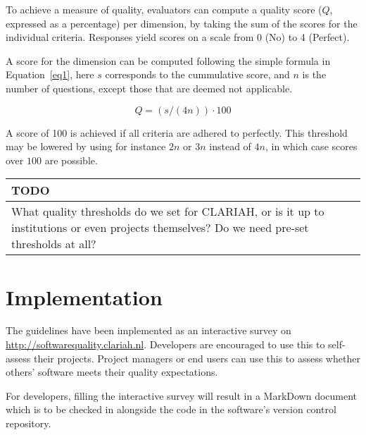 \documentclass[a4paper,11pt]{article}
\newenvironment{TODO}{
\begin{center}
    \begin{tabular}[h!]{|p{0.8\textwidth}|}
    \hline
    {\bf TODO}\\\hline}
{   \\\hline
    \end{tabular}
\end{center}}
\begin{document}
To achieve a measure of quality, evaluators can compute a quality score ($Q$,
expressed as a percentage) per dimension, by taking the sum of the scores for
the individual criteria. Responses yield scores on a scale from 0 (No) to 4 (Perfect). 

A score for the dimension can be computed following the simple formula in
Equation~\ref{eq1}, here $s$ corresponds to the cummulative score, and $n$ is
the number of questions, except those that are deemed not applicable.

\begin{equation}
\label{eq1}
Q = (s / (4n)) \cdot 100
\end{equation}

A score of 100 is achieved if all criteria are adhered to perfectly. This
threshold may be lowered by using for instance $2n$ or $3n$ instead of $4n$, in
which case scores over $100$ are possible.

\begin{TODO}
What quality thresholds do we set for CLARIAH, or is it up
to institutions or even projects themselves? Do we need pre-set thresholds at
all?
\end{TODO}



\section{Implementation}

The guidelines have been implemented as an interactive survey on
\url{http://softwarequality.clariah.nl}. Developers are
encouraged to use this to self-assess their projects. Project managers or end users can use
this to assess whether others' software meets their quality expectations.

For developers, filling the interactive survey will result in a
MarkDown document which is to be checked in alongside the code in the
software's version control repository.


\end{document}
